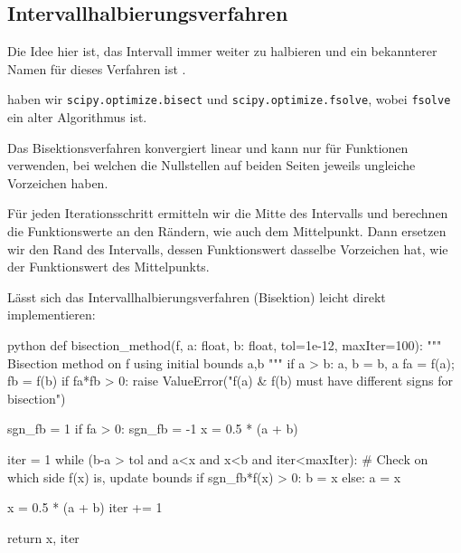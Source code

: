 \newsection
\subsection{Intervallhalbierungsverfahren}
Die Idee hier ist, das Intervall immer weiter zu halbieren und ein bekannterer Namen für dieses Verfahren ist .

\innumpy haben wir \texttt{scipy.optimize.bisect} und \texttt{scipy.optimize.fsolve}, wobei \texttt{fsolve} ein alter Algorithmus ist.

Das Bisektionsverfahren konvergiert linear und kann nur für Funktionen verwenden, bei welchen die Nullstellen auf beiden Seiten jeweils ungleiche Vorzeichen haben.

Für jeden Iterationsschritt ermitteln wir die Mitte des Intervalls und berechnen die Funktionswerte an den Rändern, wie auch dem Mittelpunkt.
Dann ersetzen wir den Rand des Intervalls, dessen Funktionswert dasselbe Vorzeichen hat, wie der Funktionswert des Mittelpunkts.

\innumpy Lässt sich das Intervallhalbierungsverfahren (Bisektion) leicht direkt implementieren:

\begin{code}{python}
def bisection_method(f, a: float, b: float, tol=1e-12, maxIter=100):
    """ Bisection method on f using initial bounds a,b """
    if a > b: a, b = b, a
    fa = f(a); fb = f(b)
    if fa*fb > 0: raise ValueError("f(a) & f(b) must have different signs for bisection")
    
    sgn_fb = 1
    if fa > 0: sgn_fb = -1
    x = 0.5 * (a + b)
    
    iter = 1
    while (b-a > tol and a<x and x<b and iter<maxIter):
        # Check on which side f(x) is, update bounds
        if sgn_fb*f(x) > 0: b = x
        else:               a = x

        x = 0.5 * (a + b)
        iter += 1
        
    return x, iter
\end{code}
